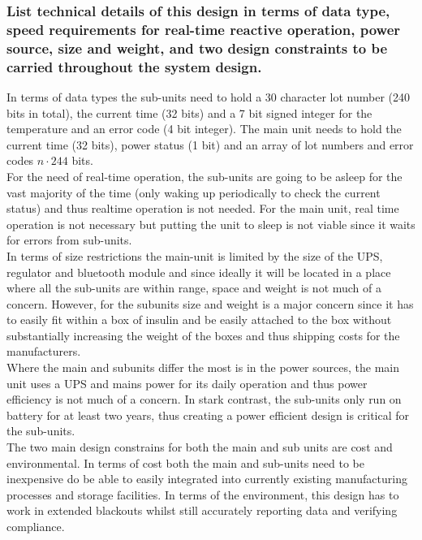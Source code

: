 \documentclass[12pt]{article} \usepackage{jeep} \usepackage{unicode}
\begin{document}
\subsubsection{List technical details of this design in terms of data type, speed
  requirements for real-time reactive operation, power source, size and weight,
  and two design constraints to be carried throughout the system design.}
In terms of data types the sub-units need to hold a 30 character lot number (240
bits in total), the current time (32 bits) and a 7 bit signed integer for the
temperature and an error code (4 bit integer). The main unit needs to hold the
current time (32 bits), power status (1 bit) and an array of lot numbers and
error codes $n\cdot244$ bits.\vspace{\baselineskip} \\
For the need of real-time operation, the sub-units are going to be asleep for the vast majority of the time (only waking up periodically to check the current status) and thus realtime operation is not needed. For the main unit, real time operation is not necessary but putting the unit to sleep is not viable since it waits for errors from sub-units.\vspace{\baselineskip}\\
In terms of size restrictions the main-unit is limited by the size of the UPS,
regulator and bluetooth module and since ideally it will be located in a place
where all the sub-units are within range, space and weight is not much of a
concern. However, for the subunits size and weight is a major concern since it
has to easily fit within a box of insulin and be easily attached to the box
without substantially increasing the weight of the boxes and thus shipping costs
for the manufacturers.\vspace{\baselineskip}\\
Where the main and subunits differ the most is in the power sources, the main unit uses a UPS and mains power for its daily operation and thus power efficiency is not much of a concern. In stark contrast, the sub-units only run on battery for at least two years, thus creating a power efficient design is critical for the sub-units.\\
The two main design constrains for both the main and sub units are cost and
environmental. In terms of cost both the main and sub-units need to be
inexpensive do be able to easily integrated into currently existing
manufacturing processes and storage facilities. In terms of the environment,
this design has to work in extended blackouts whilst still accurately reporting
data and verifying compliance.
\end{document}
